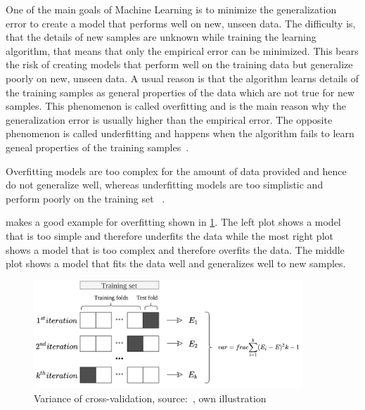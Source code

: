 One of the main goals of Machine Learning is to minimize the generalization error to create a model that performs well
on new, unseen data.
The difficulty is, that the details of new samples are unknown while training the learning algorithm, that means that
only the empirical error can be minimized.
This bears the risk of creating models that perform well on the training data but generalize poorly on new, unseen data.
A usual reason is that the algorithm learns details of the training samples as general properties of the data
which are not true for new samples.
This phenomenon is called overfitting and is the main reason why the generalization error is usually higher than the
empirical error.
The opposite phenomenon is called underfitting and happens when the algorithm fails to learn geneal properties of
the training samples~\cite[p. 26]{zhou_machinelearning_2021}.

Overfitting models are too complex for the amount of data provided and hence do not generalize well, whereas
underfitting models are too simplistic and perform poorly on the training set
~\cite[p. 28]{muller_introductionmachinelearning_2016}.

\cite{badillo2020introduction} makes a good example for overfitting shown in
\cref{fig:overfitting_example}.
The left plot shows a model that is too simple and therefore underfits the data while the most right plot shows a model
that is too complex and therefore overfits the data.
The middle plot shows a model that fits the data well and generalizes well to new samples.

\begin{figure}[h]
    \begin{tcolorbox}[arc=0pt,boxrule=0.5pt]
        \centering
        \includegraphics[trim=left botm right top, width=0.9\textwidth]
        {chap2/images/cross_validation}
        \caption{Variance of cross-validation, source:~\cite[p. 260]{muller_introductionmachinelearning_2016}, own
        illustration }
        \label{fig:overfitting_example}
    \end{tcolorbox}
\end{figure}


